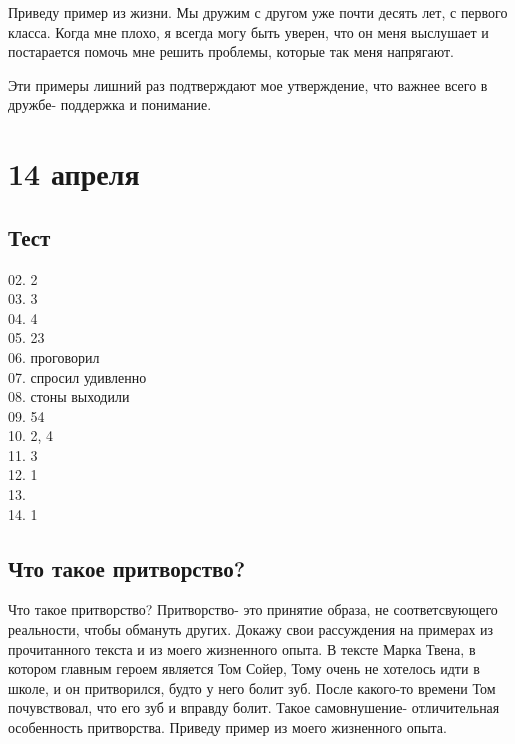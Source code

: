 \documentclass[12pt, letterpaper]{article}
\begin{document}
Приведу пример из жизни. Мы дружим с другом уже почти десять лет, с первого класса. Когда мне плохо, я всегда могу быть уверен, что он меня выслушает и постарается помочь мне решить проблемы, которые так меня напрягают.

Эти примеры лишний раз подтверждают мое утверждение,  что важнее всего в дружбе-  поддержка и понимание.

\section{14 апреля}
\subsection{Тест}
02. 2 \\
03. 3 \\
04. 4 \\
05. 23 \\
06. проговорил\\
07. спросил удивленно \\
08. стоны выходили\\
09. 54 \\
10. 2, 4\\
11. 3 \\
12. 1\\
13.\\
14. 1\\
\subsection{Что такое притворство?}

Что такое притворство? Притворство- это принятие образа, не соответсвующего реальности, чтобы обмануть других. Докажу свои рассуждения на примерах из прочитанного текста и из моего жизненного опыта.
В тексте Марка Твена, в котором главным героем является Том Сойер, Тому очень не хотелось идти в школе, и он притворился, будто у него болит зуб. После какого-то времени Том почувствовал, что его зуб и вправду болит. Такое самовнушение- отличительная особенность притворства.
Приведу пример из моего жизненного опыта.
\end{document}
